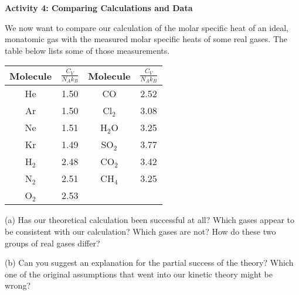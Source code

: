 \textbf{Activity 4: Comparing Calculations and Data}

We now want to compare our calculation of the molar specific heat
of an ideal, monatomic gas with the measured molar specific heats
of some real gases. The table below lists some of those measurements.

\vspace{0.3cm}
{\centering \begin{tabular}{|c|c|c|c|}
\hline 
Molecule&
\( \frac{C_{V}}{N_{A}k_{B}} \)&
Molecule&
\( \frac{C_{V}}{N_{A}k_{B}} \)\\
\hline
\hline 
He&
1.50&
CO&
2.52\\
\hline 
Ar&
1.50&
Cl\( _{2} \)&
3.08\\
\hline 
Ne&
1.51&
H\( _{2} \)O&
3.25\\
\hline 
Kr&
1.49&
SO\( _{2} \)&
3.77\\
\hline 
H\( _{2} \)&
2.48&
CO\( _{2} \)&
3.42\\
\hline 
N\( _{2} \)&
2.51&
CH\( _{4} \)&
3.25\\
\hline 
O\( _{2} \)&
2.53&
&
\\
\hline
\end{tabular}\par}
\vspace{0.3cm}

(a) Has our theoretical calculation been successful at all? Which
gases appear to be consistent with our calculation? Which gases are
not? How do these two groups of real gases differ?
\vspace{1in}

(b) Can you suggest an explanation for the partial success of the
theory? Which one of the original assumptions that went into our kinetic
theory might be wrong?\vspace{2in}


